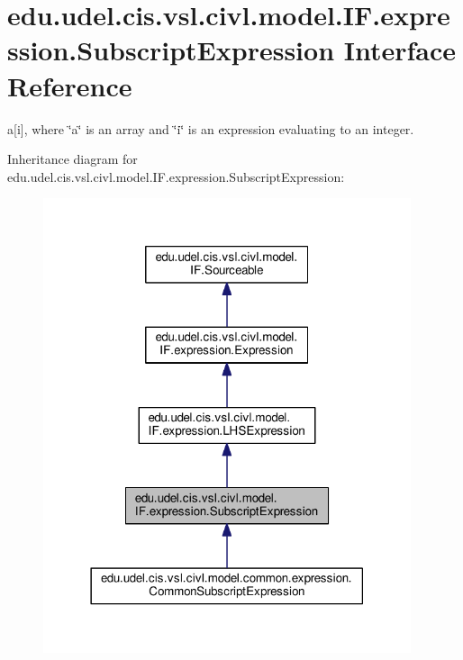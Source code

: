\hypertarget{interfaceedu_1_1udel_1_1cis_1_1vsl_1_1civl_1_1model_1_1IF_1_1expression_1_1SubscriptExpression}{}\section{edu.\+udel.\+cis.\+vsl.\+civl.\+model.\+I\+F.\+expression.\+Subscript\+Expression Interface Reference}
\label{interfaceedu_1_1udel_1_1cis_1_1vsl_1_1civl_1_1model_1_1IF_1_1expression_1_1SubscriptExpression}


a\mbox{[}i\mbox{]}, where \char`\"{}a\char`\"{} is an array and \char`\"{}i\char`\"{} is an expression evaluating to an integer.  




Inheritance diagram for edu.\+udel.\+cis.\+vsl.\+civl.\+model.\+I\+F.\+expression.\+Subscript\+Expression\+:
\nopagebreak
\begin{figure}[H]
\begin{center}
\leavevmode
\includegraphics[width=306pt]{interfaceedu_1_1udel_1_1cis_1_1vsl_1_1civl_1_1model_1_1IF_1_1expression_1_1SubscriptExpression__inherit__graph}
\end{center}
\end{figure}


